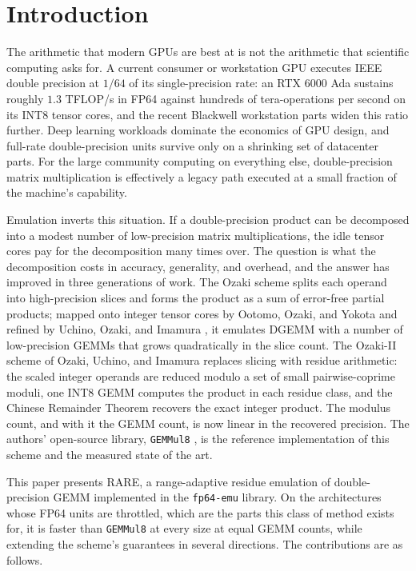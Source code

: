 \documentclass[11pt]{amsart}
\theoremstyle{plain}
\theoremstyle{definition}
\newcommand{\code}[1]{\texttt{#1}}
\newcommand{\fpemu}{\code{fp64-emu}}
\newcommand{\gemmul}{\code{GEMMul8}}
\begin{document}
\section{Introduction}

The arithmetic that modern GPUs are best at is not the arithmetic that
scientific computing asks for. A current consumer or workstation GPU
executes IEEE double precision at $1/64$ of its single-precision rate: an
RTX 6000 Ada sustains roughly $1.3$ TFLOP/s in FP64 against hundreds of
tera-operations per second on its INT8 tensor cores, and the recent
Blackwell workstation parts widen this ratio further. Deep learning
workloads dominate the economics of GPU design, and full-rate
double-precision units survive only on a shrinking set of datacenter
parts. For the large community computing on everything else, double-precision matrix
multiplication is effectively a legacy path executed at a small fraction of
the machine's capability.

Emulation inverts this situation. If a double-precision product can be
decomposed into a modest number of low-precision matrix multiplications,
the idle tensor cores pay for the decomposition many times over. The
question is what the decomposition costs in accuracy, generality, and
overhead, and the answer has improved in three generations of work. The
Ozaki scheme \cite{ozaki2012} splits each operand into high-precision
slices and forms the product as a sum of error-free partial products;
mapped onto integer tensor cores by Ootomo, Ozaki, and Yokota
\cite{ootomo2024} and refined by Uchino, Ozaki, and Imamura
\cite{uchino2025}, it emulates DGEMM with a number of low-precision GEMMs
that grows quadratically in the slice count. The Ozaki-II scheme of Ozaki,
Uchino, and Imamura \cite{ozaki2scheme} replaces slicing with residue
arithmetic: the scaled integer operands are reduced modulo a set of small
pairwise-coprime moduli, one INT8 GEMM computes the product in each residue
class, and the Chinese Remainder Theorem recovers the exact integer
product. The modulus count, and with it the GEMM count, is now linear in
the recovered precision. The authors' open-source library, \gemmul{}
\cite{gemmul8repo}, is the reference implementation of this scheme and the
measured state of the art.

This paper presents RARE, a range-adaptive residue emulation of
double-precision GEMM implemented in the \fpemu{} library. On the
architectures whose FP64 units are throttled, which are the parts this
class of method exists for, it is faster than \gemmul{} at every size at
equal GEMM counts, while extending the scheme's guarantees in several
directions. The contributions are as follows.
\end{document}

